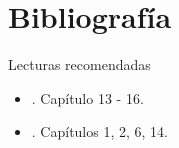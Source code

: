 \documentclass[9pt, aspectratio=169]{beamer}
\begin{document}
\section*{Bibliografía}
\begin{frame}{Lecturas recomendadas}
	\begin{itemize}
		\item {}. Capítulo 13 - 16.
		\item {}. Capítulos 1, 2, 6, 14.
	\end{itemize}
\end{frame}
\end{document}

